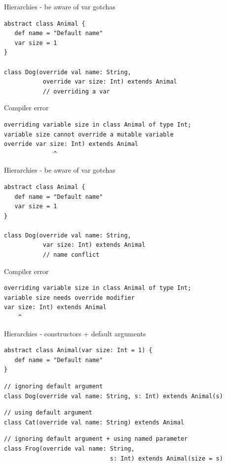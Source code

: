\begin{frame}[fragile]{Hierarchies - be aware of var gotchas}
\begin{lstlisting}
abstract class Animal {
   def name = "Default name"
   var size = 1
}

class Dog(override val name: String,
           override var size: Int) extends Animal 
           // overriding a var
\end{lstlisting}
\begin{alertblock}{Compiler error}
\begin{lstlisting}
overriding variable size in class Animal of type Int;
variable size cannot override a mutable variable
override var size: Int) extends Animal
              ^
\end{lstlisting}
\end{alertblock}
\end{frame}

\begin{frame}[fragile]{Hierarchies - be aware of var gotchas}
\begin{lstlisting}
abstract class Animal {
   def name = "Default name"
   var size = 1
}

class Dog(override val name: String,
           var size: Int) extends Animal 
           // name conflict
\end{lstlisting}
\begin{alertblock}{Compiler error}
\begin{lstlisting}
overriding variable size in class Animal of type Int;
variable size needs override modifier
var size: Int) extends Animal
    ^
\end{lstlisting}
\end{alertblock}
\end{frame}

\begin{frame}[fragile]{Hierarchies - constructors + default arguments}
\begin{lstlisting}
abstract class Animal(var size: Int = 1) {
   def name = "Default name"
}
\end{lstlisting}

\begin{lstlisting}
// ignoring default argument
class Dog(override val name: String, s: Int) extends Animal(s)
\end{lstlisting}

\begin{lstlisting}
// using default argument
class Cat(override val name: String) extends Animal
\end{lstlisting}

\begin{lstlisting}
// ignoring default argument + using named parameter
class Frog(override val name: String,
                              s: Int) extends Animal(size = s)
\end{lstlisting}
\end{frame}


